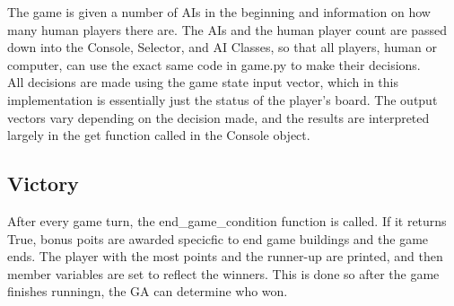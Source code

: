 The game is given a number of AIs in the beginning and information on how many human players there are.  The AIs and the human player count are passed down into the Console, Selector, and AI Classes, so that all players, human or computer, can use the exact same code in game.py to make their decisions.
\\
All decisions are made using the game state input vector, which in this implementation is essentially just the status of the player's board.   The output vectors vary depending on the decision made, and the results are interpreted largely in the get function called in the Console object.

\subsection{Victory}

After every game turn, the end{\_}game{\_}condition function is called.  If it returns True, bonus poits are awarded specicfic to end game buildings and the game ends.  The player with the most points and the runner-up are printed, and then member variables are set to reflect the winners.  This is done so after the game finishes runningn, the GA can determine who won.